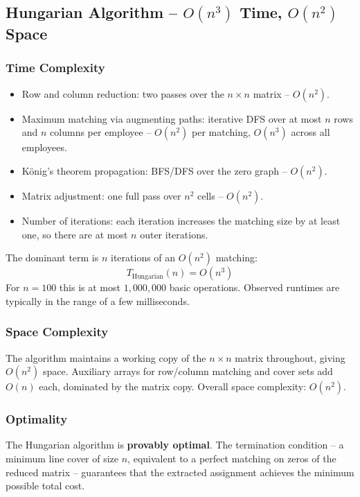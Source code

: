 \documentclass[12pt,a4paper]{article}
\begin{document}
\subsection{Hungarian Algorithm -- $O(n^3)$ Time, $O(n^2)$ Space}

\subsubsection{Time Complexity}

\begin{itemize}
    \item Row and column reduction: two passes over the $n \times n$ matrix -- $O(n^2)$.
    \item Maximum matching via augmenting paths: iterative DFS over at most $n$
          rows and $n$ columns per employee -- $O(n^2)$ per matching, $O(n^3)$
          across all employees.
    \item König's theorem propagation: BFS/DFS over the zero graph -- $O(n^2)$.
    \item Matrix adjustment: one full pass over $n^2$ cells -- $O(n^2)$.
    \item Number of iterations: each iteration increases the matching size by at
          least one, so there are at most $n$ outer iterations.
\end{itemize}

The dominant term is $n$ iterations of an $O(n^2)$ matching:
\[
    T_{\text{Hungarian}}(n) = O(n^3)
\]
For $n = 100$ this is at most $1{,}000{,}000$ basic operations. Observed runtimes
are typically in the range of a few milliseconds.

\subsubsection{Space Complexity}

The algorithm maintains a working copy of the $n \times n$ matrix throughout,
giving $O(n^2)$ space. Auxiliary arrays for row/column matching and cover sets
add $O(n)$ each, dominated by the matrix copy. Overall space complexity: $O(n^2)$.

\subsubsection{Optimality}

The Hungarian algorithm is \textbf{provably optimal}. The termination condition --
a minimum line cover of size $n$, equivalent to a perfect matching on zeros of the
reduced matrix -- guarantees that the extracted assignment achieves the minimum
possible total cost.
\end{document}
